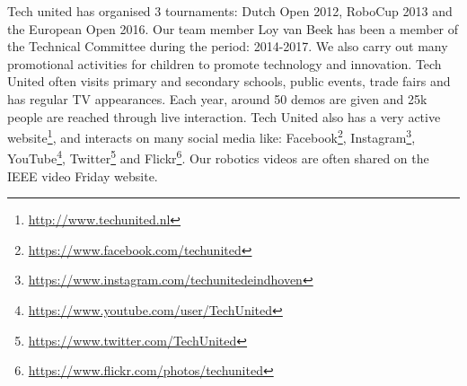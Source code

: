 Tech united has organised 3 tournaments: Dutch Open 2012, RoboCup 2013 and the European Open 2016. Our team member Loy van Beek has been a member of the Technical Committee during the period: 2014-2017.
We also carry out many promotional activities for children to promote technology and innovation. Tech United often visits primary and secondary schools, public events, trade fairs and has regular TV appearances. Each year, around 50 demos are given and 25k people are reached through live interaction.
Tech United also has a very active website\footnote{\url{http://www.techunited.nl}}, and interacts on many social media like: Facebook\footnote{\url{https://www.facebook.com/techunited}}, Instagram\footnote{\url{https://www.instagram.com/techunitedeindhoven}}, YouTube\footnote{\url{https://www.youtube.com/user/TechUnited}}, Twitter\footnote{\url{https://www.twitter.com/TechUnited}} and Flickr\footnote{\url{https://www.flickr.com/photos/techunited}}. Our robotics videos are often shared on the IEEE video Friday website.
